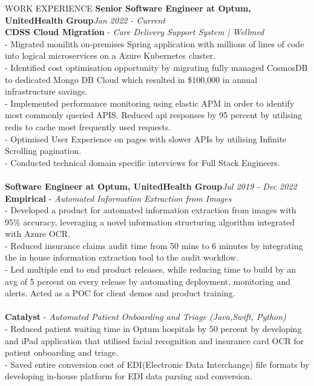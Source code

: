 \documentclass{resume} %
\begin{document}
\begin{rSection}{WORK EXPERIENCE}
{\bf Senior Software Engineer at Optum, UnitedHealth Group}\hfill {\em  Jan 2022 - Current}
\\ {\bf CDSS Cloud Migration} - {\em Care Delivery Support System | Wellmed}
\\ - Migrated monilith on-premises Spring application with millions of lines of code into logical microservices on a Azure Kubernetes cluster.
\\ - Identified cost optimisation opportunity by migrating fully managed CosmosDB to dedicated Mongo DB Cloud which resulted in \$100,000 in annual infrastructure savings.
\\ - Implemented performance monitoring using elastic APM in order to identify most commonly queried APIS. Reduced api responses by 95 percent by utilising redis to cache most frequently used requests.
\\ - Optimised User Experience on pages with slower APIs by utilising Infinite Scrolling pagination.
\\ - Conducted technical domain specific interviews for Full Stack Engineers.
\\[-0.9em]
\\{\bf Software Engineer at Optum, UnitedHealth Group}\hfill {\em  Jul 2019 - Dec 2022}
\\{\bf Empirical} - {\em Automated Information Extraction from Images}
\\ - Developed a product for automated information extraction from images with 95\% accuracy, leveraging a novel information structuring algorithm integrated with Azure OCR.
\\ - Reduced insurance claims audit time from 50 mins to 6 minutes by integrating the in house information extraction tool to the audit workflow.
\\- Led multiple end to end product releases, while reducing time to build by an avg of 5 percent on every release by automating  deployment, monitoring and alerts. Acted as a POC for client demos and product training.
\\[-0.9em]
\\{\bf Catalyst} - {\em Automated Patient Onboarding and Triage (Java,Swift, Python)}
\\ - Reduced patient waiting time in Optum hospitals by 50 percent by developing and iPad application that utilised facial recognition and insurance card OCR for patient onboarding and triage.
\\ - Saved entire conversion cost of EDI(Electronic Data Interchange) file formats by developing in-house platform for EDI data parsing and conversion.

\end{rSection}
\end{document}
